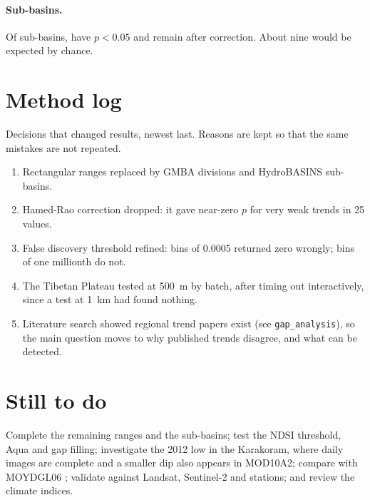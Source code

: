 \documentclass[11pt,a4paper]{article}
\begin{document}
\paragraph{Sub-basins.} Of \nSub{} sub-basins, \nSubRaw{} have $p<0.05$ and \nSubSig{} remain after correction. About nine would be expected by chance.

\section{Method log}
Decisions that changed results, newest last. Reasons are kept so that the same mistakes are not repeated.
\begin{enumerate}
\item Rectangular ranges replaced by GMBA divisions and HydroBASINS sub-basins.
\item Hamed-Rao correction dropped: it gave near-zero $p$ for very weak trends in 25 values.
\item False discovery threshold refined: bins of 0.0005 returned zero wrongly; bins of one millionth do not.
\item The Tibetan Plateau tested at 500~m by batch, after timing out interactively, since a test at 1~km had found nothing.
\item Literature search showed regional trend papers exist (see \texttt{gap\_analysis}), so the main question moves to why published trends disagree, and what can be detected.
\end{enumerate}

\section{Still to do}
Complete the remaining ranges and the sub-basins; test the NDSI threshold, Aqua and gap filling; investigate the 2012 low in the Karakoram, where daily images are complete and a smaller dip also appears in MOD10A2; compare with MOYDGL06 \citep{Muhammad_2020}; validate against Landsat, Sentinel-2 and stations; and review the climate indices.



\end{document}

